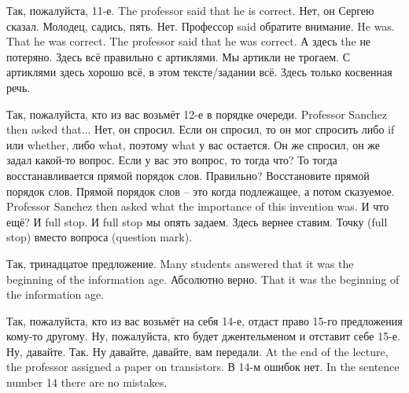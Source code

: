 \documentclass[main.tex]{subfiles}
\begin{document}
Так, пожалуйста, 11-е.
The professor said that he is correct.
Нет, он Сергею сказал.
Молодец, садись, пять.
Нет.
Профессор said обратите внимание.
He was.
That he was correct.
The professor said that he was correct.
А здесь the не потеряно.
Здесь всё правильно с артиклями.
Мы артикли не трогаем.
С артиклями здесь хорошо всё, в этом тексте/задании всё.
Здесь только косвенная речь.

Так, пожалуйста, кто из вас возьмёт 12-е в порядке очереди.
Professor Sanchez then asked that...
Нет, он спросил.
Если он спросил, то он мог спросить либо if или whether, либо what, поэтому what у вас остается.
Он же спросил, он же задал какой-то вопрос.
Если у вас это вопрос, то тогда что?
То тогда восстанавливается прямой порядок слов.
Правильно? Восстановите прямой порядок слов.
Прямой порядок слов -- это когда подлежащее, а потом сказуемое.
Professor Sanchez then asked what the importance of this invention was.
И что ещё? И full stop.
И full stop мы опять задаем.
Здесь вернее ставим.
Точку (full stop) вместо вопроса (question mark).

Так, тринадцатое предложение.
Many students answered that it was the beginning of the information age.
Абсолютно верно.
That it was the beginning of the information age.

Так, пожалуйста, кто из вас возьмёт на себя 14-е, отдаст право 15-го предложения кому-то другому.
Ну, пожалуйста, кто будет джентельменом и отставит себе 15-е.
Ну, давайте.
Так.
Ну давайте, давайте, вам передали.
At the end of the lecture, the professor assigned a paper on transistors.
В 14-м ошибок нет.
In the sentence number 14 there are no mistakes.
\end{document}
